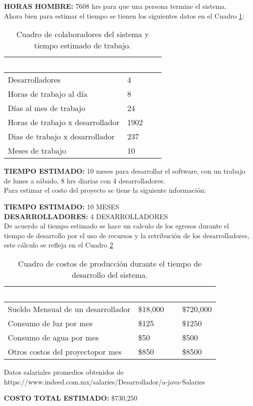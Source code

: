 \textbf {HORAS HOMBRE:} 7608 hrs para que una persona termine el sistema.\\


Ahora bien para estimar el tiempo se tienen los siguientes datos en el Cuadro \ref{tbl:colab}:

\begin{table}[H]
	\centering
	\begin{tabular}{|p{4cm}|p{4cm}|}
		\hline
		\rowcolor{black} \textcolor{white} {\textbf{Concepto}} & \textcolor{white}{\textbf{Tiempo}} \\ \hline
		Desarrolladores & 4  \\
		\hline
		Horas de trabajo al día & 8  \\
		\hline
		Días al mes de trabajo & 24  \\
		\hline
		Horas de trabajo x desarrollador & 1902  \\
		\hline
		Dias de trabajo x desarrollador & 237  \\
		\hline
		Meses de trabajo  & 10  \\
		\hline
	\end{tabular}
\caption{Cuadro de colaboradores del sistema y tiempo estimado de trabajo.}
\label{tbl:colab}
\end{table}

\textbf {TIEMPO ESTIMADO:} 10 meses para desarrollar el software, con un trabajo de lunes a sábado, 8 hrs diarias con 4 desarrolladores.\\

Para estimar el costo del proyecto se tiene la siguiente información:

\textbf {TIEMPO ESTIMADO:} 10 MESES \\
\textbf {DESARROLLADORES:} 4 DESARROLLADORES\\

De acuerdo al tiempo estimado se hace un calculo de los egresos durante el tiempo de desarrollo por el uso de recursos y la retribución de los desarrolladores,  este cálculo se refleja en el Cuadro \ref{tbl:egresos}

\begin{table}[H]
	\centering
	\begin{tabular}{|p{4cm}|p{4cm}|p{4cm}|}
		\hline
		\rowcolor{black} \textcolor{white} {\textbf{Concepto}} & \textcolor{white}{\textbf{Cantidad}} & \textcolor{white}{\textbf{Total}} \\ \hline
		Sueldo Mensual de un desarrollador & \$18,000 & \$720,000   \\
		\hline
		Consumo de luz por mes & \$125  & \$1250 \\
		\hline
		Consumo de agua por mes & \$50  & \$500  \\
		\hline
		Otros costos del proyectopor mes & \$850  & \$8500  \\
		\hline
	\end{tabular}
\caption{Cuadro de costos de producción durante el tiempo de desarrollo del sistema.}
\label{tbl:egresos}
\end{table}

Datos salariales promedios obtenidos de https://www.indeed.com.mx/salaries/Desarrollador/a-java-Salaries

\textbf {COSTO TOTAL ESTIMADO:} \$730,250  \\
